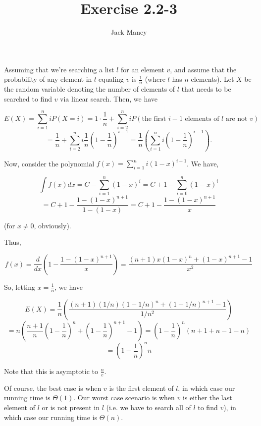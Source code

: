 \documentclass{article}
\begin{document}
\title{Exercise 2.2-3}
\author{Jack Maney}
\maketitle

Assuming that we're searching a list $l$ for an element $v$, and assume that the probability of any element in $l$ equaling $v$ is $\frac{1}{n}$ (where $l$ has $n$ elements). Let $X$ be the random variable denoting the number of elements of $l$ that needs to be searched to find $v$ via linear search. Then, we have

\[
	E(X) = \sum\limits_{i=1}^n i P(X=i) = 1 \cdot \frac{1}{n} + \sum\limits_{i=2}^n i P(\textrm{the first } i-1 \textrm{ elements of } l \textrm{ are not } v)
\]
\[
	= \frac{1}{n} + \sum\limits_{i=2}^n i \frac{1}{n} \left(1 - \frac{1}{n}\right)^{i-1}  
	= \frac{1}{n} \left(\sum\limits_{i=1}^n i  \left(1 - \frac{1}{n}\right)^{i-1}\right).
\]

Now, consider the polynomial $f(x) = \sum\limits_{i=1}^{n} i (1-x)^{i-1}$. We have,

\[
	\int f(x) dx = C - \sum\limits_{i=1}^n (1-x)^i = C + 1 - \sum\limits_{i=0}^n (1-x)^i 
\]
\[
	= C + 1  - \frac{1 - (1-x)^{n+1}}{1 - (1-x)} = C + 1 - \frac{ 1 - (1-x)^{n + 1}}{x}
\]

\noindent (for $x\not=0$, obviously).

Thus,

\[
	f(x) = \frac{d}{dx}\left( 1 - \frac{ 1 - (1-x)^{n + 1}}{x} \right)
	= \frac{(n+1)x(1-x)^n + (1-x)^{n+1} - 1}{x^2}
\]

So, letting $x = \frac{1}{n}$, we have

\[
	E(X) = \frac{1}{n}\left( \frac{(n+1)(1/n)(1-1/n)^n + (1-1/n)^{n+1}-1}{1/n^2} \right) 
\]
\[
	= n\left(\frac{n+1}{n}\left(1 - \frac{1}{n}\right)^n + \left( 1 - \frac{1}{n}\right)^{n+1} - 1\right) 
	= \left(1 - \frac{1}{n}\right)^n(n+1 + n - 1 - n)
\]
\[
	= \left(1 - \frac{1}{n}\right)^n n
\]

Note that this is asymptotic to $\frac{n}{e}$.

Of course, the best case is when $v$ is the first element of $l$, in which case our running time is $\Theta(1)$. Our worst case scenario is when $v$ is either the last element of $l$ or is not present in $l$ (i.e. we have to search all of $l$ to find $v$), in which case our running time is $\Theta(n)$.
\end{document}
